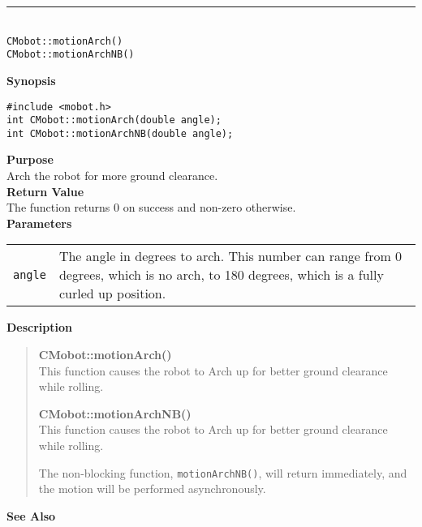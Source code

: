 \noindent
\vspace{5pt}
\rule{4.5in}{0.015in}\\
\noindent
{\LARGE \texttt{CMobot::motionArch()}}\\
{\LARGE \texttt{CMobot::motionArchNB()}}\\
{}

\noindent
{\bf Synopsis}
\vspace{-8pt}
\begin{verbatim}
#include <mobot.h>
int CMobot::motionArch(double angle);
int CMobot::motionArchNB(double angle);
\end{verbatim}

\noindent
{\bf Purpose}\\
Arch the robot for more ground clearance.\\

\noindent
{\bf Return Value}\\
The function returns 0 on success and non-zero otherwise.\\

\noindent
{\bf Parameters}\\
\vspace{-0.1in}
\begin{description}
\item               
\begin{tabular}{p{10 mm}p{145 mm}}
\texttt{angle} & The angle in degrees to arch. This number can range from 0 degrees, which is
no arch, to 180 degrees, which is a fully curled up position.\\
\end{tabular}
\end{description}

\noindent
{\bf Description}\\
\vspace{-12pt}
\begin{quote}
{\bf CMobot::motionArch()}\\
This function causes the robot to Arch up for better ground clearance while 
rolling.

{\bf CMobot::motionArchNB()}\\
This function causes the robot to Arch up for better ground clearance while 
rolling.

The non-blocking function, \texttt{motionArchNB()},
will return immediately, and the motion will be performed asynchronously.\\
\end{quote}

\noindent
{\bf See Also}\\

